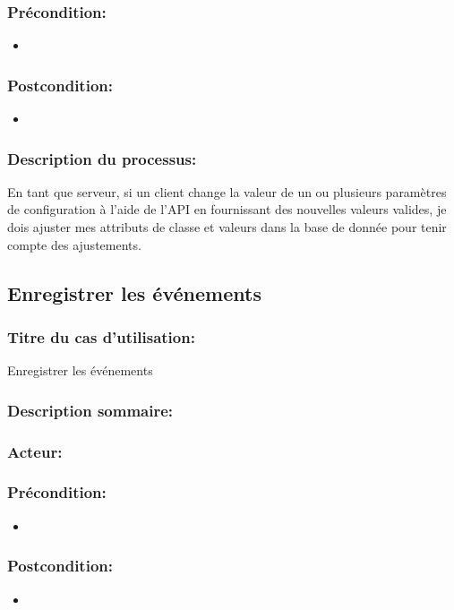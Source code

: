 \documentclass{scrreprt}
\begin{document}
\subsubsection{Précondition:}
\begin{itemize}
    \item  
\end{itemize} 
\subsubsection{Postcondition:}
\begin{itemize}
    \item  
\end{itemize} 
\subsubsection{Description du processus:}En tant que serveur, si un client change la valeur de un ou plusieurs paramètres
de configuration à l'aide de l'API en fournissant des nouvelles valeurs valides,
je dois ajuster mes attributs de classe et valeurs dans la base de donnée
pour tenir compte des ajustements.

\subsection{Enregistrer les événements}
\subsubsection{Titre du cas d'utilisation:} Enregistrer les événements
\subsubsection{Description sommaire:}
\subsubsection{Acteur:}
\subsubsection{Précondition:}
\begin{itemize}
    \item  
\end{itemize} 
\subsubsection{Postcondition:}
\begin{itemize}
    \item  
\end{itemize} 
\end{document}
